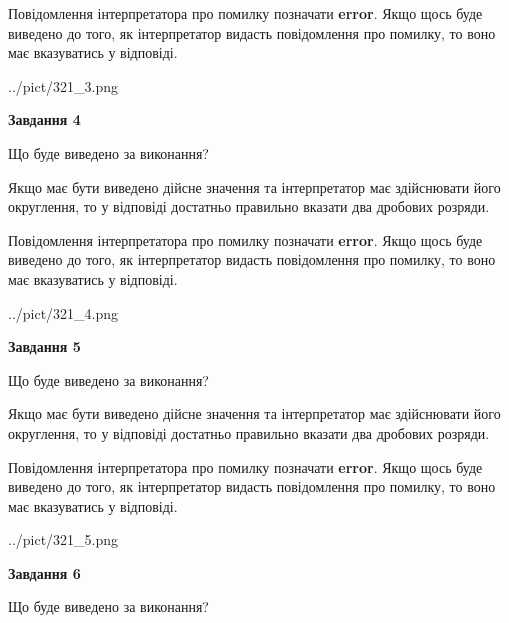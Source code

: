 \documentclass[12pt, ukrainian]{article}
\begin{document}
{\begin {Large}
Повідомлення інтерпретатора про помилку позначати \textbf{error}.
Якщо щось буде виведено до того, як інтерпретатор видасть повідомлення про помилку, 
то воно має вказуватись у відповіді. \par

\begin{center}
	{../pict/321_3.png}
\end{center}
\newpage

{\begin {center}\textbf{Завдання 4}\end {center}}\par
Що буде виведено за виконання? \par

Якщо має бути виведено дійсне значення та інтерпретатор має здійснювати його округлення, 
то у відповіді достатньо правильно вказати два дробових розряди.

Повідомлення інтерпретатора про помилку позначати \textbf{error}.
Якщо щось буде виведено до того, як інтерпретатор видасть повідомлення про помилку, 
то воно має вказуватись у відповіді. \par

\begin{center}
	{../pict/321_4.png}
\end{center}
\newpage

{\begin {center}\textbf{Завдання 5}\end {center}}\par
Що буде виведено за виконання? \par

Якщо має бути виведено дійсне значення та інтерпретатор має здійснювати його округлення, 
то у відповіді достатньо правильно вказати два дробових розряди.

Повідомлення інтерпретатора про помилку позначати \textbf{error}.
Якщо щось буде виведено до того, як інтерпретатор видасть повідомлення про помилку, 
то воно має вказуватись у відповіді. \par

\begin{center}
	{../pict/321_5.png}
\end{center}
\newpage

{\begin {center}\textbf{Завдання 6}\end {center}}\par
Що буде виведено за виконання? \par


\end{Large}}
\end{document}
